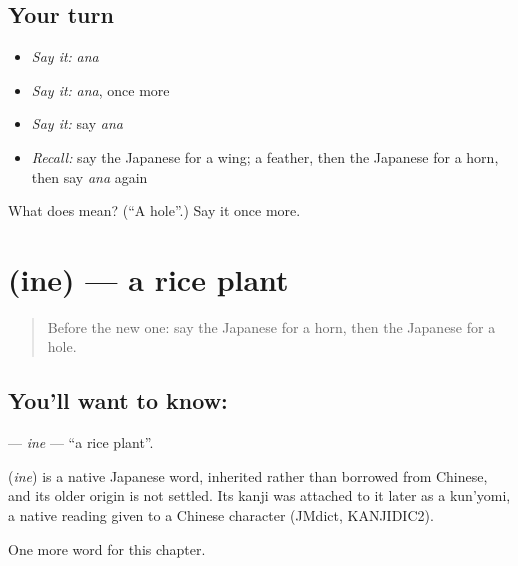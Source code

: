 \subsection*{Your turn}
\begin{itemize}
\raggedright
  \item \emph{Say it:} \emph{ana}
  \item \emph{Say it:} \emph{ana}, once more
  \item \emph{Say it:} say \emph{ana}
  \item \emph{Recall:} say the Japanese for a wing; a feather, then the Japanese for a horn, then say \emph{ana} again
\end{itemize}

\begin{tcolorbox}[breakable,colback=teal!4,colframe=teal!35!black,title={Before you move on}]
What does  mean? (\textquotedblleft{}A hole\textquotedblright{}.) Say it once more.
\end{tcolorbox}
\section[\texorpdfstring{\ja{いね} (ine)}{いね (ine)}]{ (ine) — a rice plant}

\label{lesson:JA-C71-ine}



\begin{quote}
Before the new one: say the Japanese for a horn, then the Japanese for a hole.
\end{quote}

\subsection*{You'll want to know: }
\textbf{} — \emph{ine} — \textquotedblleft{}a rice plant\textquotedblright{}.

\begin{cousinweb}
\textbf{} (\emph{ine}) is a native Japanese word, inherited rather than borrowed from Chinese, and its older origin is not settled. Its kanji was attached to it later as a kun'yomi, a native reading given to a Chinese character (JMdict, KANJIDIC2).
\end{cousinweb}

\begin{grammarlens}[title={What you've built}]
One more word for this chapter.
\end{grammarlens}

